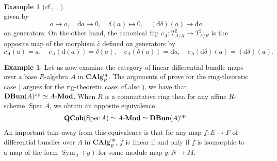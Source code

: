 \documentclass{amsart}
\theoremstyle{definition}
\newtheorem{example}[equation]{Example}
\DeclareMathOperator{\sym}{Sym}
\DeclareMathOperator{\op}{op}
\DeclareMathOperator{\Spec}{Spec}
\newcommand{\CAlg}[1]{\mathbf{CAlg}_{#1}}
\newcommand{\Sym}[1]{\sym_{#1}}
\DeclareMathOperator{\DBun}{\mathbf{DBun}}
\newcommand{\Mod}[1]{{#1}\textnormal{-}\mathbf{Mod}}
\numberwithin{equation}{subsection}
\begin{document}
\begin{example}[{cf.\@ \cite[Example 4.2]{GeoffJSDiffBunComAlg}, \cite{RobinMePartialMapRigs}, \cite{JSMeMapFlavoursInTanCats}}]
\begin{equation}
	\end{equation}
	given by
	\[
	a \mapsto a,\quad \mathrm{d}a \mapsto 0,\quad  \delta(a) \mapsto 0,\quad (\mathrm{d}\delta)(a) \mapsto \mathrm{d}a
	\]
	on generators. On the other hand, the canonical flip $c_{A}:T^2_{A/R} \to T^2_{A/R}$ is the opposite map of the morphism $\hat{c}$ defined on generators by
	\begin{equation}\label{Eqn: Section Tangent: Tangent Structure of Affine CanonFlip Map}
	c_A(a) = a,\quad c_A(\mathrm{d}(a)) = \delta(a),\quad c_A(\delta(a)) = \mathrm{d}a,\quad c_A(\mathrm{d}\delta)(a) = (\mathrm{d}\delta)(a).
	\end{equation}
\end{example}
\begin{example}
	Let us now examine the category of linear differential bundle maps over a base $R$-algebra $A$ in $\CAlg{R}^{\op}$. The arguments of \cite[Theorem 4.17]{GeoffJSDiffBunComAlg} prove for the ring-theoretic case (\cite[Remark 4.20]{GeoffJSDiffBunComAlg} argues for the rig-theoretic case; cf.\@ also \cite[Example 2.2.4]{JSMeMapFlavoursInTanCats}), we have that $\DBun(A)^{\op} \simeq \Mod{A}$. When $R$ is a commutative ring then for any affine $R$-scheme $\Spec A$, we obtain an opposite equivalence
	\[
	\mathbf{QCoh}(\Spec A) \simeq \Mod{A} \simeq \DBun(A)^{\op}.
	\]
	An important take-away from this equivalence is that for any map $f:E \to F$ of differential bundles over $A$ in $\CAlg{R}^{\op}$, $f$ is linear if and only if $f$ is isomorphic to a map of the form $\Sym{A}(g)$ for some module map $g:N \to M$.
\end{example}
\end{document}
